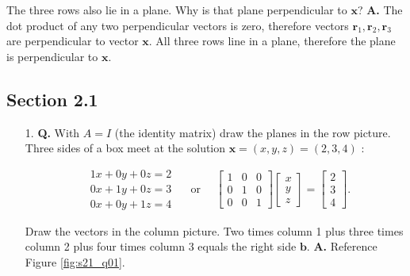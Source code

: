 \documentclass[main.tex]{subfiles}
\begin{document}
\begin{enumerate}
        The three rows also lie in a plane. Why is that plane perpendicular to $\bm{x}$? \textbf{A.} The dot product of any two perpendicular vectors is zero, therefore vectors $\bm{r}_1, \bm{r}_2, \bm{r}_3$ are perpendicular to vector $\bm{x}$. All three rows line in a plane, therefore the plane is perpendicular to $\bm{x}$.
        
    \end{enumerate}

\subsection{Section 2.1}

    \begin{enumerate}
        \item [1.] \textbf{Q.} With $A=I$ (the identity matrix) draw the planes in the row picture. Three sides of a box meet at the solution $\bm{x}=(x, y, z)=(2,3,4)$ :
        
        $$
        \begin{aligned}
        &1 x+0 y+0 z=2 \\
        &0 x+1 y+0 z=3 \\
        &0 x+0 y+1 z=4
        \end{aligned} \quad \text { or } \quad\left[\begin{array}{lll}
        1 & 0 & 0 \\
        0 & 1 & 0 \\
        0 & 0 & 1
        \end{array}\right]\left[\begin{array}{l}
        x \\
        y \\
        z
        \end{array}\right]=\left[\begin{array}{l}
        2 \\
        3 \\
        4
        \end{array}\right] \text {. }
        $$
        
        Draw the vectors in the column picture. Two times column 1 plus three times column 2 plus four times column 3 equals the right side $\bm{b}$. \textbf{A.} Reference Figure \ref{fig:s21_q01}.
        

\end{enumerate}
\end{document}
